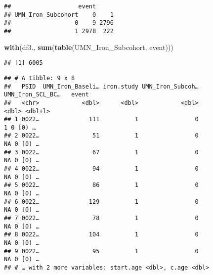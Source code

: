 \documentclass[
]{article}
\newenvironment{Shaded}{\begin{snugshade}}{\end{snugshade}}
\newcommand{\DecValTok}[1]{\textcolor[rgb]{0.00,0.00,0.81}{#1}}
\newcommand{\KeywordTok}[1]{\textcolor[rgb]{0.13,0.29,0.53}{\textbf{#1}}}
\newcommand{\NormalTok}[1]{#1}
\newcommand{\OperatorTok}[1]{\textcolor[rgb]{0.81,0.36,0.00}{\textbf{#1}}}
\newcommand{\StringTok}[1]{\textcolor[rgb]{0.31,0.60,0.02}{#1}}
\begin{document}
\begin{verbatim}
##                   event
## UMN_Iron_Subcohort    0    1
##                  0    9 2796
##                  1 2978  222
\end{verbatim}

\begin{Shaded}
\begin{Highlighting}[]
\KeywordTok{with}\NormalTok{(df3., }\KeywordTok{sum}\NormalTok{(}\KeywordTok{table}\NormalTok{(UMN_Iron_Subcohort, event)))}
\end{Highlighting}
\end{Shaded}

\begin{verbatim}
## [1] 6005
\end{verbatim}

\begin{Shaded}
\end{Shaded}

\begin{verbatim}
## # A tibble: 9 x 8
##   PSID  UMN_Iron_Baseli… iron.study UMN_Iron_Subcoh… UMN_Iron_SCL_BC…   event
##   <chr>            <dbl>      <dbl>            <dbl>            <dbl> <dbl+l>
## 1 0022…              111          1                0                1 0 [0) …
## 2 0022…               51          1                0               NA 0 [0) …
## 3 0022…               67          1                0               NA 0 [0) …
## 4 0022…               94          1                0               NA 0 [0) …
## 5 0022…               86          1                0               NA 0 [0) …
## 6 0022…              129          1                0               NA 0 [0) …
## 7 0022…               78          1                0               NA 0 [0) …
## 8 0022…              104          1                0               NA 0 [0) …
## 9 0022…               95          1                0               NA 0 [0) …
## # … with 2 more variables: start.age <dbl>, c.age <dbl>
\end{verbatim}
\end{document}
